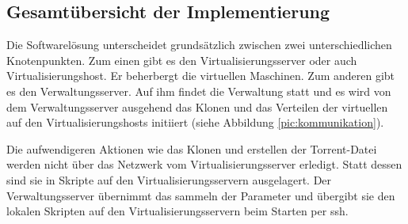 \subsection{Gesamtübersicht der Implementierung}
Die Softwarelösung unterscheidet grundsätzlich zwischen zwei unterschiedlichen Knotenpunkten. Zum einen gibt es den Virtualisierungsserver oder auch Virtualisierungshost. Er beherbergt die virtuellen Maschinen. Zum anderen gibt es den Verwaltungsserver. Auf ihm findet die Verwaltung statt und es wird von dem Verwaltungsserver ausgehend das Klonen und das Verteilen der virtuellen auf den Virtualisierungshosts initiiert (siehe Abbildung \ref{pic:kommunikation}).


Die aufwendigeren Aktionen wie das Klonen und erstellen der Torrent-Datei werden nicht über das Netzwerk vom Virtualisierungsserver erledigt. Statt dessen sind sie in Skripte auf den Virtualisierungsservern ausgelagert. Der Verwaltungsserver übernimmt das sammeln der Parameter und übergibt sie den lokalen Skripten auf den Virtualisierungsservern beim Starten per ssh.